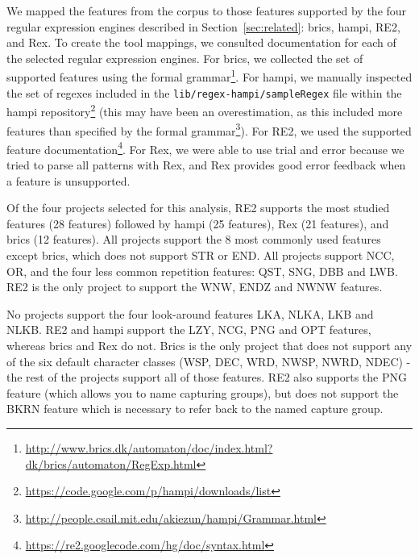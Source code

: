  We  mapped the features from the corpus to those features supported by the four regular expression engines described in Section~\ref{sec:related}: brics, hampi, RE2, and Rex.
To create the tool mappings, we consulted documentation for each of the selected regular expression engines. For brics, we collected the set of supported features using the formal grammar\footnote{\url{http://www.brics.dk/automaton/doc/index.html?dk/brics/automaton/RegExp.html}}.  For hampi, we manually inspected the set of regexes included in the {\tt lib/regex-hampi/sampleRegex} file within the hampi repository\footnote{\url{https://code.google.com/p/hampi/downloads/list}} (this may have been an overestimation, as this included more features than specified by the formal grammar\footnote{\url{http://people.csail.mit.edu/akiezun/hampi/Grammar.html}}).  For RE2, we used the  supported feature documentation\footnote{\url{https://re2.googlecode.com/hg/doc/syntax.html}}.  For Rex, we were able to use trial and error because we tried to parse all patterns with Rex, and Rex provides good error feedback when a feature is unsupported.



Of the four projects selected for this analysis, RE2 supports the most studied features (28 features) followed by hampi (25 features),  Rex (21 features), and brics (12 features).  All projects support the 8 most commonly used features except brics, which does not support STR or END.  All projects support NCC, OR, and the four less common repetition features: QST, SNG, DBB and LWB.  RE2 is the only project to support the WNW, ENDZ and NWNW features.

\leavevmode\color{gray}
No projects support the four look-around features LKA, NLKA, LKB and NLKB.  RE2 and hampi support the LZY, NCG, PNG and OPT features, whereas brics and Rex do not.  Brics is the only project that does not support any of the six default character classes (WSP, DEC, WRD, NWSP, NWRD, NDEC) - the rest of the projects support all of those features.  RE2 also supports the PNG feature (which allows you to name capturing groups), but does not support the BKRN feature which is necessary to refer back to the named capture group.
\leavevmode\color{black}


